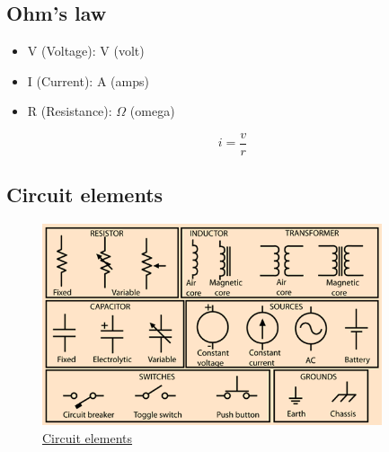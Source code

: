 \documentclass{article}
\begin{document}
\subsection{Ohm's law}
\begin{itemize}
  \item V (Voltage): V (volt)
  \item I (Current): A (amps)
  \item R (Resistance): $\Omega$ (omega)
\end{itemize}

\begin{equation} i = \frac{v}{r} \end{equation}


\subsection{Circuit elements}
\begin{figure}[h]
    \vspace{10mm}
    \centering
    \includegraphics[width=10cm]{image/circuit-elements.png}
    \caption{\href{http://hyperphysics.phy-astr.gsu.edu/hbasees/Electronic/cktelcon.html}{Circuit elements}}
\end{figure}
\end{document}

